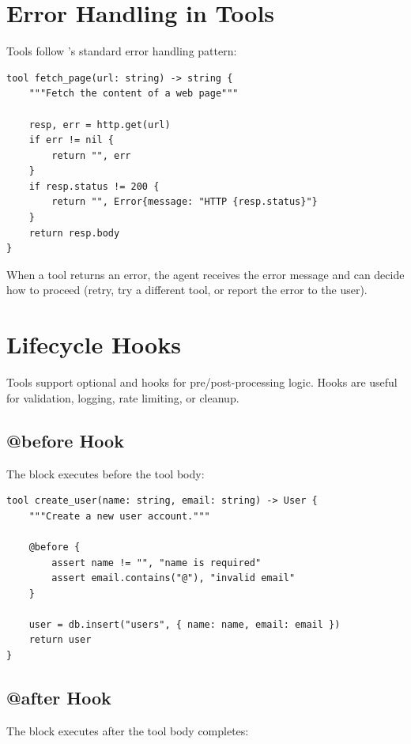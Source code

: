 \section{Error Handling in Tools}

Tools follow \haira{}'s standard error handling pattern:

\begin{lstlisting}
tool fetch_page(url: string) -> string {
    """Fetch the content of a web page"""

    resp, err = http.get(url)
    if err != nil {
        return "", err
    }
    if resp.status != 200 {
        return "", Error{message: "HTTP {resp.status}"}
    }
    return resp.body
}
\end{lstlisting}

When a tool returns an error, the agent receives the error message and can decide how to proceed (retry, try a different tool, or report the error to the user).

\section{Lifecycle Hooks}

Tools support optional  and  hooks for pre/post-processing logic. Hooks are useful for validation, logging, rate limiting, or cleanup.

\subsection{@before Hook}

The  block executes before the tool body:

\begin{lstlisting}
tool create_user(name: string, email: string) -> User {
    """Create a new user account."""

    @before {
        assert name != "", "name is required"
        assert email.contains("@"), "invalid email"
    }

    user = db.insert("users", { name: name, email: email })
    return user
}
\end{lstlisting}

\subsection{@after Hook}

The  block executes after the tool body completes:

